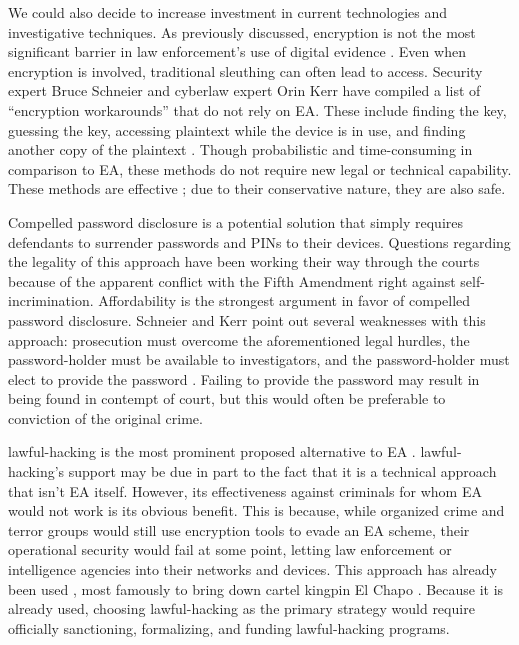 \documentclass{IEEEtran}
\begin{document}
We could also decide to increase investment in current technologies and investigative techniques. As previously
discussed, encryption is not the most significant barrier in law enforcement's use of digital evidence
\cite{carter_2018}. Even when encryption is involved, traditional sleuthing can often lead to access. Security expert
Bruce Schneier and cyberlaw expert Orin Kerr have compiled a list of ``encryption workarounds'' that do not rely on
\ac{EA}. These include finding the key, guessing the key, accessing plaintext while the device is in use, and finding
another copy of the plaintext \cite{kerr_encryption_2017}. Though probabilistic and time-consuming in comparison to
\ac{EA}, these methods do not require new legal or technical capability. These methods are effective
\cite{greenberg_2018}; due to their conservative nature, they are also safe.

Compelled password disclosure is a potential solution that simply requires defendants to surrender passwords and
\acp{PIN} to their devices. Questions regarding the legality of this approach have been working their way through the
courts \cite{bittenbender_2019} \cite{sobel_2019} because of the apparent conflict with the Fifth Amendment right
against self-incrimination. Affordability is the strongest argument in favor of compelled password disclosure. Schneier
and Kerr point out several weaknesses with this approach: prosecution must overcome the aforementioned legal hurdles,
the password-holder must be available to investigators, and the password-holder must elect to provide the password
\cite{kerr_encryption_2017}. Failing to provide the password may result in being found in contempt of court, but this
would often be preferable to conviction of the original crime.

\Ac{lawful-hacking} is the most prominent proposed alternative to \ac{EA} \cite{bellovin_lawful_2013}
\cite{hennessey_lawful_2016} \cite{rozenshtein_wicked_2018} \cite{kerr_encryption_2017} \cite{soesanto_2018}.
\Ac{lawful-hacking}'s support may be due in part to the fact that it is a technical approach that isn't \ac{EA} itself.
However, its effectiveness against criminals for whom \ac{EA} would not work is its obvious benefit. This is because,
while organized crime and terror groups would still use encryption tools to evade an \ac{EA} scheme, their operational
security would fail at some point, letting law enforcement or intelligence agencies into their networks and devices.
This approach has already been used \cite{cox_2020}, most famously to bring down cartel kingpin El Chapo
\cite{feuer_chapo_2019}. Because it is already used, choosing \ac{lawful-hacking} as the primary strategy would require
officially sanctioning, formalizing, and funding \ac{lawful-hacking} programs.
\end{document}

